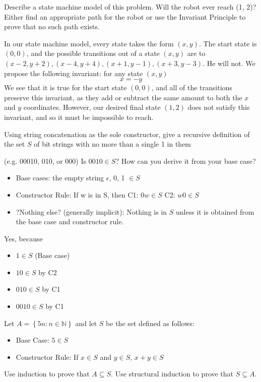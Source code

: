 \documentclass[solution, letterpaper]{cs20}
\begin{document}
\subproblem Describe a state machine model of this problem.
\subproblem Will the robot ever reach (1, 2)? Either find an appropriate path for the robot or use the Invariant Principle to prove that no such path exists.

\begin{solution}
\subsolution In our state machine model, every state takes the form $(x,y)$. The start state is $(0,0)$, and the possible transitions out of a state $(x,y)$ are to $(x-2, y+2),(x-4,y+4),(x+1,y-1),(x+3,y-3)$.
\subsolution He will not.
We propose the following invariant: for any state $(x,y)$ 
\[x = -y \]
We see that it is true for the start state $(0,0)$, and all of the transitions preserve this invariant, as they add or subtract the same amount to both the $x$ and $y$ coordinates. However, our desired final state $(1,2)$ does not satisfy this invariant, and so it must be impossible to reach.
\end{solution}

\subproblem Using string concatenation as the sole constructor, give a recursive definition of the set $S$ of bit strings with no more than a single 1 in them 

(e.g. 00010, 010, or 000)
\subproblem Is $0010\in S$? How can you derive it from your base case?

\begin{solution}
\subsolution
\begin{itemize}
\item Base cases: the empty string $\epsilon$, 0, 1 $\in S$
\item Constructor Rule: If w is in S, then
\subitem C1: $0w\in S$
\subitem C2: $w0\in S$
\item ?Nothing else? (generally implicit): Nothing is in $S$ unless it is obtained from the base case and constructor rule.
\end{itemize}
\subsolution Yes, because
\begin{itemize}
\item $1\in S$ (Base case)
\item $10\in S$ by C2 
\item $010\in S$ by C1
\item $0010\in S$ by C1
\end{itemize}
\end{solution}

Let $A = \left\{ {5n:n\in\mathbb{N}}\right\}$ and let $S$ be the set defined as follows:
\begin{itemize}
\item Base Case: $5 \in S$
\item Constructor Rule: If $x\in S$ and $y\in S$, $x+y \in S$ 
\end{itemize}
\subproblem Use induction to prove that $A\subseteq S $.
\subproblem Use structural induction to prove that $S\subseteq A$.
\end{document}
